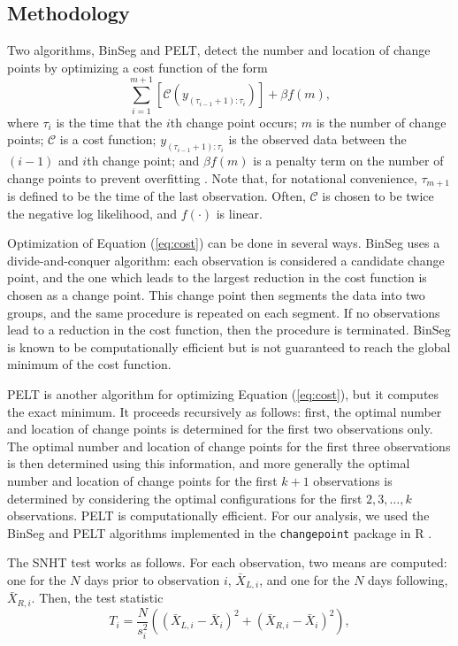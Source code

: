\documentclass[12pt]{article}
\begin{document}
\begin{doublespacing}
\subsection{Methodology}
\label{ssec:methodology}

Two algorithms, BinSeg and PELT, detect the number and location of change points by optimizing a cost function of the form
\begin{equation}
	\sum_{i=1}^{m+1} [\mathcal{C}(y_{(\tau_{i-1}+1):\tau_i})] + \beta f(m),
	\label{eq:cost}
\end{equation}
where $\tau_i$ is the time that the $i$th change point occurs; $m$ is the number of change points; $\mathcal{C}$ is a cost function; $y_{(\tau_{i-1}+1):\tau_i}$ is the observed data between the $(i-1)$ and $i$th change point; and $\beta f(m)$ is a penalty term on the number of change points to prevent overfitting \cite{killick12}.  Note that, for notational convenience, $\tau_{m+1}$ is defined to be the time of the last observation.  Often, $\mathcal{C}$ is chosen to be twice the negative log likelihood, and $f(\cdot)$ is linear.

Optimization of Equation (\ref{eq:cost}) can be done in several ways.  BinSeg uses a divide-and-conquer algorithm: each observation is considered a candidate change point, and the one which leads to the largest reduction in the cost function is chosen as a change point.  This change point then segments the data into two groups, and the same procedure is repeated on each segment.  If no observations lead to a reduction in the cost function, then the procedure is terminated.  BinSeg is known to be computationally efficient but is not guaranteed to reach the global minimum of the cost function.

PELT is another algorithm for optimizing Equation (\ref{eq:cost}), but it computes the exact minimum.  It proceeds recursively as follows: first, the optimal number and location of change points is determined for the first two observations  only.  The optimal number and location of change points for the first three observations is then determined using this information, and more generally the optimal number and location of change points for the first $k+1$ observations is determined by considering the optimal configurations for the first $2, 3, \ldots, k$ observations.  PELT is computationally efficient.  For our analysis, we used the BinSeg and PELT algorithms implemented in the \texttt{changepoint} package in R \cite{killick14}.

The SNHT test works as follows.  For each observation, two means are computed: one for the $N$ days prior to observation $i$, $\bar{X}_{L,i}$, and one for the $N$ days following, $\bar{X}_{R,i}$.  Then, the test statistic
\begin{equation}
	T_i = \frac{N}{s_i^2}\left( (\bar{X}_{L,i}-\bar{X}_i)^2 + (\bar{X}_{R,i}-\bar{X}_i)^2\right),
	\label{eq:Hom}
\end{equation}


\end{doublespacing}
\end{document}
